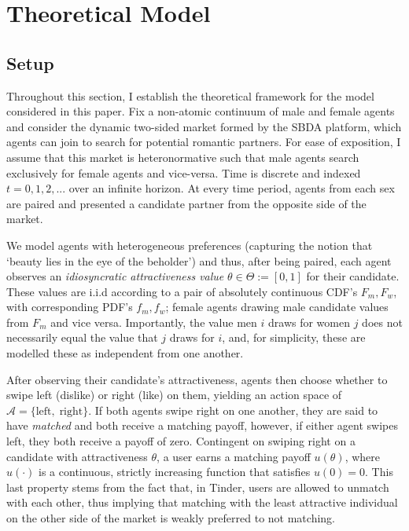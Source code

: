 \section{Theoretical Model}
\label{sec:section2}
\subsection{Setup}\label{sec:section2.1} 
Throughout this section, I establish the theoretical framework for the model considered in this paper. Fix a non-atomic continuum of male and female agents and consider the dynamic two-sided market formed by the SBDA platform, which agents can join to search for potential romantic partners. 
For ease of exposition, I assume that this market is heteronormative such that male agents search exclusively for female agents and vice-versa. 
Time is discrete and indexed $t=0, 1, 2, ...$ over an infinite horizon. 
At every time period, agents from each sex are paired and presented a candidate partner from the opposite side of the market. 

We model agents with heterogeneous preferences (capturing the notion that `beauty lies in the eye of the beholder') and thus, after being paired, each agent observes an \textit{idiosyncratic attractiveness value} $\theta \in \Theta := [0,1]$ for their candidate. These values are i.i.d according to a pair of absolutely continuous CDF's $F_m, F_w$, with corresponding PDF's $f_m,f_w$; female agents drawing male candidate values from $F_m$ and vice versa. Importantly, the value men $i$ draws for women $j$ does not necessarily equal the value that $j$ draws for $i$, and, for simplicity, these are modelled these as independent from one another.

After observing their candidate's attractiveness, agents then choose whether to swipe left (dislike) or right (like) on them, yielding an action space of $\mathcal{A}=\{ \text{left},\; \text{right}\}$. 
If both agents swipe right on one another, they are said to have \textit{matched} and both receive a matching payoff, however, if either agent swipes left, they both receive a payoff of zero. Contingent on swiping right on a candidate with attractiveness $\theta$, a user earns a matching payoff $u(\theta)$, where $u(\cdot)$ is a continuous, strictly increasing function that satisfies $u(0) = 0$. 
This last property stems from the fact that, in Tinder, users are allowed to unmatch with each other, thus implying that matching with the least attractive individual on the other side of the market is weakly preferred to not matching. 

